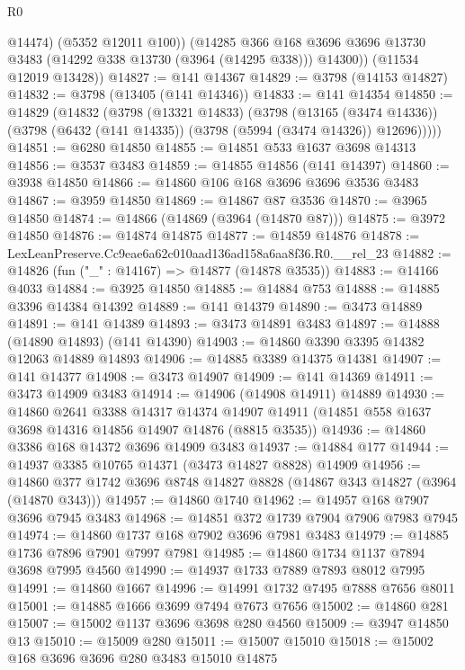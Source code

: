 \begin{lexlean}{R0}
\begin{coremodule}
            @14474)
          (@5352 @12011 @100))
        (@14285
          @366
          @168
          @3696
          @3696
          @13730
          @3483
          (@14292 @338 @13730 (@3964 (@14295 @338)))
          @14300))
      (@11534 @12019 @13428))
@14827 := @141 @14367
@14829 := @3798 (@14153 @14827)
@14832 := @3798 (@13405 (@141 @14346))
@14833 := @141 @14354
@14850 := @14829
    (@14832
      (@3798
        (@13321 @14833)
        (@3798
          (@13165 (@3474 @14336))
          (@3798 (@6432 (@141 @14335)) (@3798 (@5994 (@3474 @14326)) @12696)))))
@14851 := @6280 @14850
@14855 := @14851 @533 @1637 @3698 @14313
@14856 := @3537 @3483
@14859 := @14855 @14856 (@141 @14397)
@14860 := @3938 @14850
@14866 := @14860 @106 @168 @3696 @3696 @3536 @3483
@14867 := @3959 @14850
@14869 := @14867 @87 @3536
@14870 := @3965 @14850
@14874 := @14866 (@14869 (@3964 (@14870 @87)))
@14875 := @3972 @14850
@14876 := @14874 @14875
@14877 := @14859 @14876
@14878 := LexLeanPreserve.Cc9eae6a62c010aad136ad158a6aa8f36.R0.__rel_23
@14882 := @14826 (fun ("_" : @14167) => @14877 (@14878 @3535))
@14883 := @14166 @4033
@14884 := @3925 @14850
@14885 := @14884 @753
@14888 := @14885 @3396 @14384 @14392
@14889 := @141 @14379
@14890 := @3473 @14889
@14891 := @141 @14389
@14893 := @3473 @14891 @3483
@14897 := @14888 (@14890 @14893) (@141 @14390)
@14903 := @14860 @3390 @3395 @14382 @12063 @14889 @14893
@14906 := @14885 @3389 @14375 @14381
@14907 := @141 @14377
@14908 := @3473 @14907
@14909 := @141 @14369
@14911 := @3473 @14909 @3483
@14914 := @14906 (@14908 @14911) @14889
@14930 := @14860
    @2641
    @3388
    @14317
    @14374
    @14907
    @14911
    (@14851 @558 @1637 @3698 @14316 @14856 @14907 @14876 (@8815 @3535))
@14936 := @14860 @3386 @168 @14372 @3696 @14909 @3483
@14937 := @14884 @177
@14944 := @14937 @3385 @10765 @14371 (@3473 @14827 @8828) @14909
@14956 := @14860 @377 @1742 @3696 @8748 @14827 @8828 (@14867 @343 @14827 (@3964 (@14870 @343)))
@14957 := @14860 @1740
@14962 := @14957 @168 @7907 @3696 @7945 @3483
@14968 := @14851 @372 @1739 @7904 @7906 @7983 @7945
@14974 := @14860 @1737 @168 @7902 @3696 @7981 @3483
@14979 := @14885 @1736 @7896 @7901 @7997 @7981
@14985 := @14860 @1734 @1137 @7894 @3698 @7995 @4560
@14990 := @14937 @1733 @7889 @7893 @8012 @7995
@14991 := @14860 @1667
@14996 := @14991 @1732 @7495 @7888 @7656 @8011
@15001 := @14885 @1666 @3699 @7494 @7673 @7656
@15002 := @14860 @281
@15007 := @15002 @1137 @3696 @3698 @280 @4560
@15009 := @3947 @14850 @13
@15010 := @15009 @280
@15011 := @15007 @15010
@15018 := @15002 @168 @3696 @3696 @280 @3483 @15010 @14875

\end{coremodule}
\end{lexlean}
